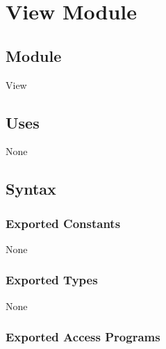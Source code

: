 \documentclass[12pt]{article}
\begin{document}


\newpage

\section* {View Module}

\subsection*{Module}

View

\subsection* {Uses}

None

\subsection* {Syntax}

\subsubsection* {Exported Constants}

None

\subsubsection* {Exported Types}

None

\subsubsection* {Exported Access Programs}
\end{document}
